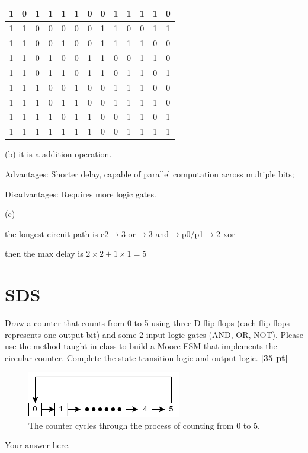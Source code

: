 \documentclass[a4paper]{article}
\begin{document}
\begin{answer}[Question 1]
\begin{center}
\begin{tabular}{ |c|c|c|c|c|c|c|c|c|c|c|c|c| }
            \hline
            1&0&1&1&1&1&0&0&1&1&1&1&0\\
            \hline
            1&1&0&0&0&0&0&1&1&0&0&1&1\\
            \hline
            1&1&0&0&1&0&0&1&1&1&1&0&0\\
            \hline
            1&1&0&1&0&0&1&1&0&0&1&1&0\\
            \hline
            1&1&0&1&1&0&1&1&0&1&1&0&1\\
            \hline
            1&1&1&0&0&1&0&0&1&1&1&0&0\\
            \hline
            1&1&1&0&1&1&0&0&1&1&1&1&0\\
            \hline
            1&1&1&1&0&1&1&0&0&1&1&0&1\\
            \hline
            1&1&1&1&1&1&1&0&0&1&1&1&1\\
            \hline
        \end{tabular}        
    \end{center}
    (b)
    it is a addition operation.


    Advantages: Shorter delay, capable of parallel computation across multiple bits;

    Disadvantages: Requires more logic gates.

    (c)

    the longest circuit path is c2$\rightarrow$3-or$\rightarrow$3-and$\rightarrow$p0/p1$\rightarrow$2-xor

    then the max delay is $2\times2+1\times1=5$
\end{answer}

\newpage
\section{SDS}
Draw a counter that counts from 0 to 5 using three D flip-flops (each flip-flops represents one output bit) and some 2-input logic gates (AND, OR, NOT). Please use the method taught in class to build a Moore FSM that implements the circular counter. Complete the state transition logic and output logic. \textbf{[35 pt]}
\begin{figure}[hp]
    \centering
    \includegraphics[height=2cm]{q2.png}
    \caption{The counter cycles through the process of counting from 0 to 5.}
    \label{fig:q2}
\end{figure}
\begin{answer}[Question 2]
        Your answer here.
\end{answer}
\end{document}

